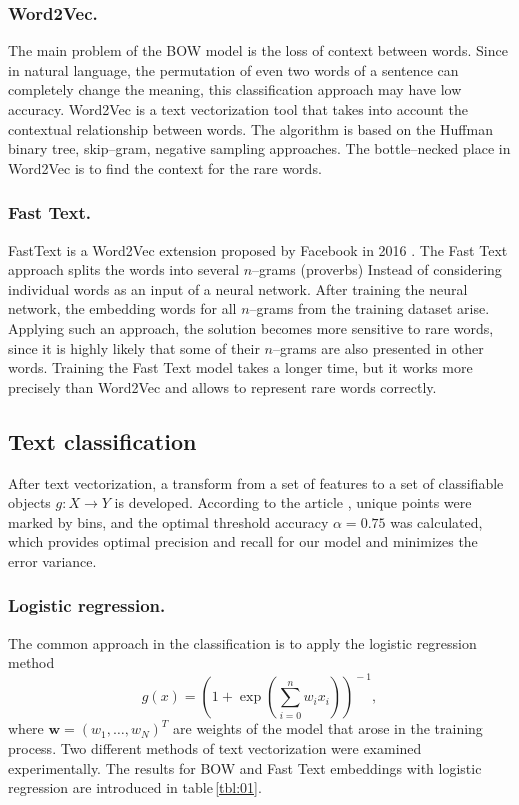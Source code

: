\documentclass[12pt]{jpconf}
\begin{document}
\subsubsection*{Word2Vec.}
The main problem of the BOW model is the loss of context between words. Since in natural language, the permutation of even two words of a sentence can completely change the meaning, this classification approach may have low accuracy.
Word2Vec is a text vectorization tool that takes into account the contextual relationship between words. The algorithm is based on the Huffman binary tree, skip--gram, negative sampling approaches. The bottle--necked place in Word2Vec is to find the context for the rare words.

\subsubsection*{Fast Text.}
FastText is a Word2Vec extension proposed by Facebook in 2016 \cite{Mikolov2013,Bojanowski2017}. The Fast Text approach splits the words into several $n$--grams (proverbs) Instead of considering individual words as an input of a neural network. After training the neural network, the embedding words for all $n$--grams from the training dataset arise.
Applying such an approach, the solution becomes more sensitive to rare words, since it is highly likely that some of their $n$--grams are also presented in other words. Training the Fast Text model takes a longer time, but it works more precisely than Word2Vec and allows to represent rare words correctly.

\subsection{Text classification}
After text vectorization, a transform from a set of features to a set of classifiable objects $g: X \rightarrow Y$ is developed.
According to the article \cite{Bommannavar2014,Yang2014}, unique points were marked by bins, and the optimal threshold accuracy $\alpha = 0.75$ was calculated, which provides optimal precision and recall for our model and minimizes the error variance.

\subsubsection*{Logistic regression.}
The common approach in the classification is to apply the logistic regression method
$$
g(x) = \left(1 + \exp{ \left( \sum_{i=0}^n w_i x_i  \right) }\right)^{\!\!-1}\!\!\!\!,
$$
where $\mathbf{w}=(w_1,\ldots, w_N)^T$ are weights of the model that arose in the training process.
Two different methods of text vectorization were examined experimentally.
The results for BOW and Fast Text embeddings with logistic regression are introduced in table\,\ref{tbl:01}.
\end{document}

